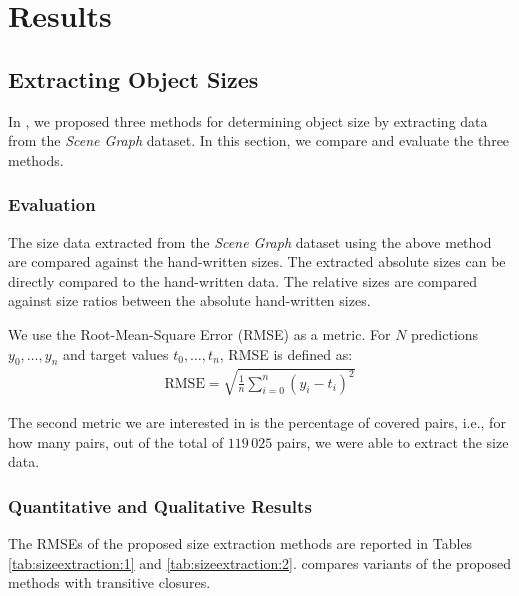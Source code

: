 \chapter{Results}

\section{Extracting Object Sizes}

In , we proposed three methods for determining object size by extracting data from the \emph{Scene Graph} \citep{xu2017scenegraph} dataset. In this section, we compare and evaluate the three methods.

\subsection{Evaluation}

The size data extracted from the \emph{Scene Graph} \citep{xu2017scenegraph} dataset using the above method are compared against the hand-written sizes. The extracted absolute sizes can be directly compared to the hand-written data. The relative sizes are compared against size ratios between the absolute hand-written sizes.

\medskip

We use the Root-Mean-Square Error (RMSE) as a metric. For $N$ predictions $y_0, \dots, y_n$ and target values $t_0, \dots, t_n$, RMSE is defined as:
\begin{align*}
    \text{RMSE} = \sqrt{\frac{1}{n}\sum_{i = 0}^n (y_i - t_i)^2}
\end{align*}

\medskip

The second metric we are interested in is the percentage of covered pairs, i.e., for how many pairs, out of the total of $119\,025$ pairs, we were able to extract the size data.

\subsection{Quantitative and Qualitative Results}

The RMSEs of the proposed size extraction methods are reported in Tables \ref{tab:sizeextraction:1} and \ref{tab:sizeextraction:2}.  compares variants of the proposed methods with transitive closures.





